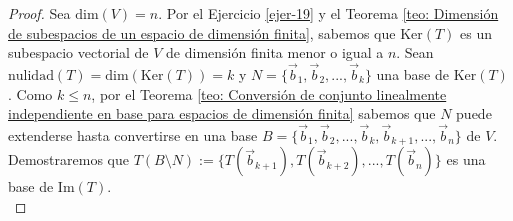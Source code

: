 \documentclass[apuntes]{subfiles}
\begin{document}
\begin{proof}

    Sea $\text{dim}(V)=n$. Por el Ejercicio \ref{ejer-19} y el Teorema \ref{teo: Dimensión de subespacios de un espacio de dimensión finita}, sabemos que $\text{Ker}(T)$ es un subespacio vectorial de $V$ de dimensión finita menor o igual a $n$. Sean $\text{nulidad}(T)=\text{dim}(\text{Ker}(T))=k$ y $N=\{\vec{b}_1,\vec{b}_2,...,\vec{b}_k\}$ una base de $\text{Ker}(T)$. Como $k\le n$, por el Teorema \ref{teo: Conversión de conjunto linealmente independiente en base para espacios de dimensión finita} sabemos que $N$ puede extenderse hasta convertirse en una base $B=\{\vec{b}_1,\vec{b}_2,...,\vec{b}_k, \vec{b}_{k+1}, ..., \vec{b}_n\}$ de $V$. Demostraremos que $T(B\setminus N):=\{T(\vec{b}_{k+1}),T(\vec{b}_{k+2}),...,T(\vec{b}_n)\}$ es una base de $\text{Im}(T)$. \\


\end{proof}
\end{document}

